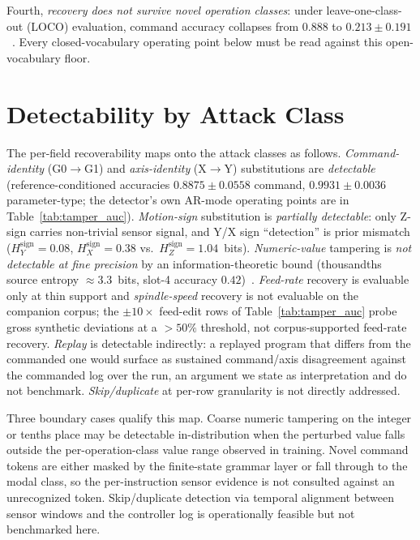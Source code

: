 \documentclass[sensors,article,submit,moreauthors,pdftex]{Definitions/mdpi}
\begin{document}
Fourth, \emph{recovery does not survive novel operation classes}: under leave-one-class-out (LOCO) evaluation, command accuracy collapses from $0.888$ to $0.213 \pm 0.191$~\cite{decoder_paper}. Every closed-vocabulary operating point below must be read against this open-vocabulary floor.

\section{Detectability by Attack Class}
\label{sec:detectability}

The per-field recoverability maps onto the attack classes as follows. \emph{Command-identity} (G0$\to$G1) and \emph{axis-identity} (X$\to$Y) substitutions are \emph{detectable} (reference-conditioned accuracies $0.8875 \pm 0.0558$ command, $0.9931 \pm 0.0036$ parameter-type; the detector's own AR-mode operating points are in Table~\ref{tab:tamper_auc}). \emph{Motion-sign} substitution is \emph{partially detectable}: only Z-sign carries non-trivial sensor signal, and Y/X sign ``detection'' is prior mismatch ($H_{Y}^{\text{sign}}\!=\!0.08$, $H_{X}^{\text{sign}}\!=\!0.38$ vs.\ $H_{Z}^{\text{sign}}\!=\!1.04$~bits). \emph{Numeric-value} tampering is \emph{not detectable at fine precision} by an information-theoretic bound (thousandths source entropy $\approx 3.3$~bits, slot-4 accuracy $0.42$)~\cite{paperB_entropy}. \emph{Feed-rate} recovery is evaluable only at thin support and \emph{spindle-speed} recovery is not evaluable on the companion corpus; the $\pm 10\times$ feed-edit rows of Table~\ref{tab:tamper_auc} probe gross synthetic deviations at a $>\!50\%$ threshold, not corpus-supported feed-rate recovery. \emph{Replay} is detectable indirectly: a replayed program that differs from the commanded one would surface as sustained command/axis disagreement against the commanded log over the run, an argument we state as interpretation and do not benchmark. \emph{Skip/duplicate} at per-row granularity is not directly addressed.

Three boundary cases qualify this map. Coarse numeric tampering on the integer or tenths place may be detectable in-distribution when the perturbed value falls outside the per-operation-class value range observed in training. Novel command tokens are either masked by the finite-state grammar layer or fall through to the modal class, so the per-instruction sensor evidence is not consulted against an unrecognized token. Skip/duplicate detection via temporal alignment between sensor windows and the controller log is operationally feasible but not benchmarked here.
\end{document}
